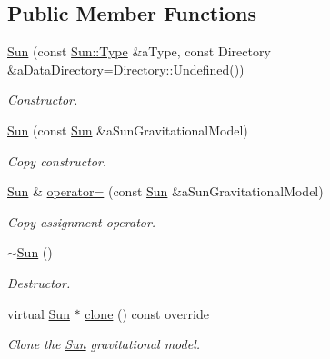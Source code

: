 \subsection*{Public Member Functions}
\begin{DoxyCompactItemize}
\item 
\hyperlink{classostk_1_1physics_1_1environment_1_1gravitational_1_1_sun_a7ddf138affec0ef4b739bfa508ecfbbf}{Sun} (const \hyperlink{classostk_1_1physics_1_1environment_1_1gravitational_1_1_sun_ae567145f71c7750a9e4e43a309bd19db}{Sun\+::\+Type} \&a\+Type, const Directory \&a\+Data\+Directory=Directory\+::\+Undefined())
\begin{DoxyCompactList}\small\item\em Constructor. \end{DoxyCompactList}\item 
\hyperlink{classostk_1_1physics_1_1environment_1_1gravitational_1_1_sun_a3c2504abf25c3af22a41cdc8d793838e}{Sun} (const \hyperlink{classostk_1_1physics_1_1environment_1_1gravitational_1_1_sun}{Sun} \&a\+Sun\+Gravitational\+Model)
\begin{DoxyCompactList}\small\item\em Copy constructor. \end{DoxyCompactList}\item 
\hyperlink{classostk_1_1physics_1_1environment_1_1gravitational_1_1_sun}{Sun} \& \hyperlink{classostk_1_1physics_1_1environment_1_1gravitational_1_1_sun_a9eb14731759cdb1a8ab4b92c5e193111}{operator=} (const \hyperlink{classostk_1_1physics_1_1environment_1_1gravitational_1_1_sun}{Sun} \&a\+Sun\+Gravitational\+Model)
\begin{DoxyCompactList}\small\item\em Copy assignment operator. \end{DoxyCompactList}\item 
\hyperlink{classostk_1_1physics_1_1environment_1_1gravitational_1_1_sun_ad7441f87bf6088f1f1d4fbf6e9dd6ff6}{$\sim$\+Sun} ()
\begin{DoxyCompactList}\small\item\em Destructor. \end{DoxyCompactList}\item 
virtual \hyperlink{classostk_1_1physics_1_1environment_1_1gravitational_1_1_sun}{Sun} $\ast$ \hyperlink{classostk_1_1physics_1_1environment_1_1gravitational_1_1_sun_aa884bdf367fcbe7aa81289cc077c9dad}{clone} () const override
\begin{DoxyCompactList}\small\item\em Clone the \hyperlink{classostk_1_1physics_1_1environment_1_1gravitational_1_1_sun}{Sun} gravitational model. \end{DoxyCompactList}\item 

\end{DoxyCompactItemize}
